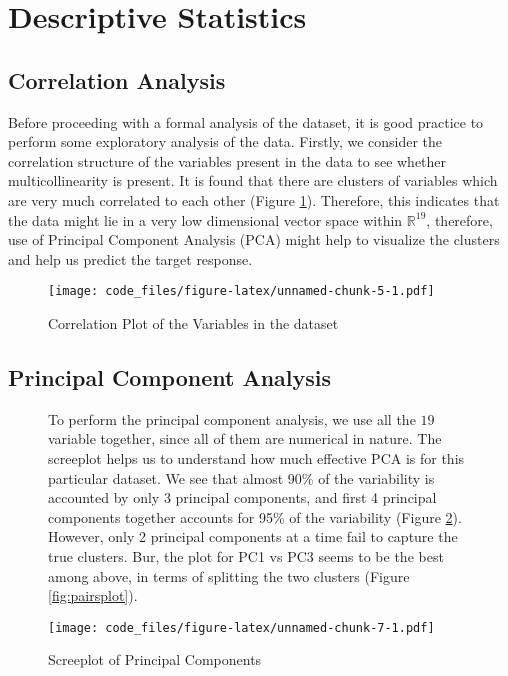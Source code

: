 \documentclass[10pt]{article}
\begin{document}
\section{Descriptive Statistics}

\subsection{Correlation Analysis}

Before proceeding with a formal analysis of the dataset, it is good practice to perform some exploratory analysis of the data. Firstly, we consider the correlation structure of the variables present in the data to see whether multicollinearity is present. It is found that there are clusters of variables which are very much correlated to each other (Figure \ref{fig:corrplot}). Therefore, this indicates that the data might lie in a very low dimensional vector space within \(\mathbb{R}^{19}\), therefore, use of Principal Component Analysis (PCA) might help to visualize the clusters and help us predict the target response.

\begin{figure}[H]
	\begin{center}
		\texttt{[image: code\_files/figure-latex/unnamed-chunk-5-1.pdf]}
		\caption{Correlation Plot of the Variables in the dataset}
		\label{fig:corrplot}
	\end{center}
\end{figure}



\subsection{Principal Component Analysis}



\begin{figure}[H]
\begin{minipage}{0.5\linewidth}
	To perform the principal component analysis, we use all the \(19\) variable together, since all of them are numerical in nature. The screeplot helps us to understand how much effective PCA is for this particular dataset. We see that almost 90\% of the variability is accounted by only 3 principal components, and first 4 principal components together accounts for 95\% of the variability (Figure \ref{fig:screeplot}). However, only 2 principal components at a time fail to capture the true clusters. Bur, the plot for PC1 vs PC3 seems to be the best
	among above, in terms of splitting the two clusters (Figure \ref{fig:pairsplot}).	
\end{minipage}
\begin{minipage}{0.5\linewidth}
		\begin{center}
			\texttt{[image: code\_files/figure-latex/unnamed-chunk-7-1.pdf]}
			\caption{Screeplot of Principal Components}	
			\label{fig:screeplot}
		\end{center}
	
\end{minipage}
\end{figure}
\end{document}
